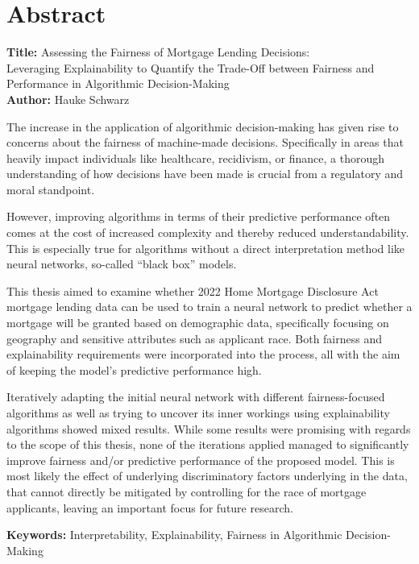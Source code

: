 \chapter*{Abstract}\label{abstract}

\noindent
\textbf{Title:} Assessing the Fairness of Mortgage Lending Decisions: \\
Leveraging Explainability to Quantify the Trade-Off between Fairness and Performance in Algorithmic Decision-Making \\ 
\textbf{Author:} Hauke Schwarz
\vspace{1em}

The increase in the application of algorithmic decision-making has given rise to concerns about the fairness of machine-made decisions. 
Specifically in areas that heavily impact individuals like healthcare, recidivism, or finance, a thorough understanding of how decisions have been made is crucial from a regulatory and moral standpoint.

However, improving algorithms in terms of their predictive performance often comes at the cost of increased complexity and thereby reduced understandability. 
This is especially true for algorithms without a direct interpretation method like neural networks, so-called “black box” models.

This thesis aimed to examine whether 2022 Home Mortgage Disclosure Act mortgage lending data can be used to train a neural network to predict whether a mortgage will be granted based on demographic data, specifically focusing on geography and sensitive attributes such as applicant race. 
Both fairness and explainability requirements were incorporated into the process, all with the aim of keeping the model’s predictive performance high.

Iteratively adapting the initial neural network with different fairness-focused algorithms as well as trying to uncover its inner workings using explainability algorithms showed mixed results. 
While some results were promising with regards to the scope of this thesis, none of the iterations applied managed to significantly improve fairness and/or predictive performance of the proposed model. 
This is most likely the effect of underlying discriminatory factors underlying in the data, that cannot directly be mitigated by controlling for the race of mortgage applicants, leaving an important focus for future research.

\vspace{3em}

\textbf{Keywords:} Interpretability, Explainability, Fairness in Algorithmic Decision-Making \\